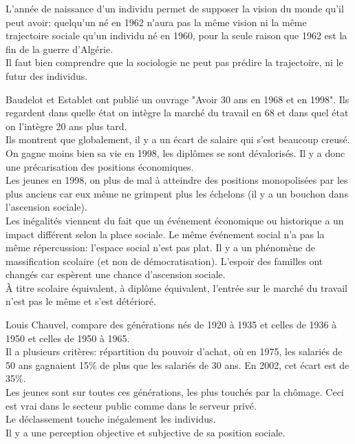 \documentclass[10pt, a4paper, openany]{book}
\begin{document}
L'année de naissance d'un individu permet de supposer la vision du monde qu'il peut avoir: quelqu'un né en 1962 n'aura pas la même vision ni la même trajectoire sociale qu'un individu né en 1960, pour la seule raison que 1962 est la fin de la guerre d'Algérie. \\
Il faut bien comprendre que la sociologie ne peut pas prédire la trajectoire, ni le futur des individus. 


Baudelot et Establet ont publié un ouvrage "Avoir 30 ans en 1968 et en 1998". Ils regardent dans quelle état on intègre la marché du travail en 68 et dans quel état on l'intègre 20 ans plus tard. \\
Ils montrent que globalement, il y a un écart de salaire qui s'est beaucoup creusé. On gagne moins bien sa vie en 1998, les diplômes se sont dévalorisés. Il y a donc une précarisation des positions économiques. \\
Les jeunes en 1998, on plus de mal à atteindre des positions monopolisées par les plus anciens car eux même ne grimpent plus les échelons (il y a un bouchon dans l'ascension sociale). \\
Les inégalités viennent du fait que un événement économique ou historique a un impact différent selon la place sociale. Le même événement social n'a pas la même répercussion: l'espace social n'est pas plat.
Il y a un phénomène de massification scolaire (et non de démocratisation). L'espoir des familles ont changés car espèrent une chance d'ascension sociale. \\
À titre scolaire équivalent, à diplôme équivalent, l'entrée sur le marché du travail n'est pas le même et s'est détérioré. 


Louis Chauvel, compare des générations nés de 1920 à 1935 et celles de 1936 à 1950 et celles de 1950 à 1965. \\
Il a plusieurs critères: répartition du pouvoir d'achat, où en 1975, les salariés de 50 ans gagnaient 15\% de plus que les salariés de 30 ans. En 2002, cet écart est de 35\%. \\
Les jeunes sont sur toutes ces générations, les plus touchés par la chômage. Ceci est vrai dans le secteur public comme dans le serveur privé. \\
Le déclassement touche inégalement les individus. \\
Il y a une perception objective et subjective de sa position sociale. 
\end{document}
